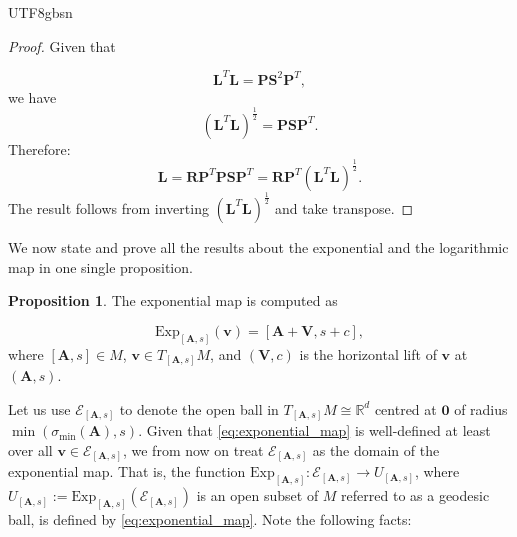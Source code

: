 \documentclass[12pt]{report}
\theoremstyle{plain}
\theoremstyle{definition}
\newtheorem{proposition}[theorem]{Proposition}
\begin{document}
\begin{CJK*}{UTF8}{gbsn}
\begin{proof}
Given that

\begin{equation*}
  \bm{L}^T\bm{L} = \bm{P}\bm{S}^2\bm{P}^T,
\end{equation*}
we have
\begin{equation*}
  (\bm{L}^T \bm{L})^{\frac{1}{2}} = \bm{P}\bm{S}\bm{P}^T.
\end{equation*}
Therefore:
\begin{equation*}
  \bm{L} = \bm{R}\bm{P}^T\bm{P}\bm{S}\bm{P}^T = \bm{R}\bm{P}^T (\bm{L}^T \bm{L})^{\frac{1}{2}}.
\end{equation*}
The result follows from inverting $(\bm{L}^T \bm{L})^{\frac{1}{2}}$ and take transpose.
\end{proof}

We now state and prove all the results about 
the exponential and the logarithmic map 
in one single proposition.

\begin{proposition}\label{thm:exponential_map}
The exponential map 
is computed as 

\begin{equation}\label{eq:exponential_map}
  \text{Exp}_{[\bm{A},s]}(\bm{v}) = [\bm{A} + \bm{V}, s + c],
\end{equation}
where $[\bm{A},s] \in M$, $\bm{v} \in T_{[\bm{A},s]}M$,
and $(\bm{V},c)$ is the horizontal lift of $\bm{v}$ at $(\bm{A},s)$.

Let us use $\mathcal{E}_{[\bm{A},s]}$
to denote the open ball in $T_{[\bm{A},s]}M \cong \mathbb{R}^{d}$
centred at $\bm{0}$ of radius $\min(\sigma_{\text{min}}(\bm{A}),s)$.
Given that \eqref{eq:exponential_map} is well-defined 
at least
over all $\bm{v} \in \mathcal{E}_{[\bm{A},s]}$,
we from now on treat $\mathcal{E}_{[\bm{A},s]}$
as the domain of the exponential map.
That is, the function $\text{Exp}_{[\bm{A},s]}: \mathcal{E}_{[\bm{A},s]} \to U_{[\bm{A},s]}$,
where $U_{[\bm{A},s]} := \text{Exp}_{[\bm{A},s]}(\mathcal{E}_{[\bm{A},s]})$ is an 
open subset of $M$ referred to as a geodesic ball,
is defined by \eqref{eq:exponential_map}.
Note the following facts:


\end{proposition}
\end{CJK*}
\end{document}
